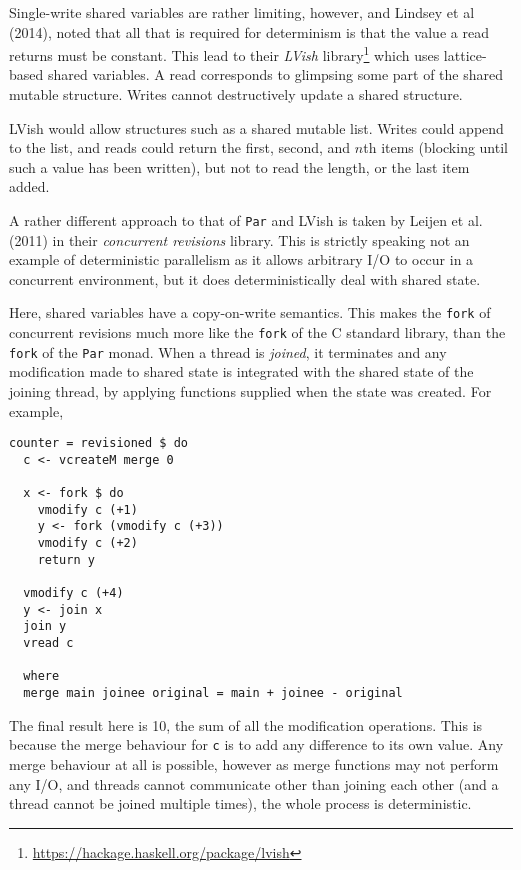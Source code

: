 Single-write shared variables are rather limiting, however, and
Lindsey et al (2014)\nocite{lvish}, noted that all that is required
for determinism is that the value a read returns must be
constant. This lead to their \textit{LVish}
library\footnote{\url{https://hackage.haskell.org/package/lvish}}
which uses lattice-based shared variables. A read corresponds to
glimpsing some part of the shared mutable structure. Writes cannot
destructively update a shared structure.

LVish would allow structures such as a shared mutable list. Writes
could append to the list, and reads could return the first, second,
and $n$th items (blocking until such a value has been written), but
not to read the length, or the last item added.

A rather different approach to that of \verb|Par| and LVish is taken
by Leijen et al. (2011)\nocite{revisions} in their \textit{concurrent
  revisions} library. This is strictly speaking not an example of
deterministic parallelism as it allows arbitrary I/O to occur in a
concurrent environment, but it does deterministically deal with shared
state.

Here, shared variables have a copy-on-write semantics. This makes the
\verb|fork| of concurrent revisions much more like the \verb|fork| of
the C standard library, than the \verb|fork| of the \verb|Par|
monad. When a thread is \textit{joined}, it terminates and any
modification made to shared state is integrated with the shared state
of the joining thread, by applying functions supplied when the state
was created. For example,

\begin{verbatim}
counter = revisioned $ do
  c <- vcreateM merge 0

  x <- fork $ do
    vmodify c (+1)
    y <- fork (vmodify c (+3))
    vmodify c (+2)
    return y

  vmodify c (+4)
  y <- join x
  join y
  vread c

  where
  merge main joinee original = main + joinee - original
\end{verbatim}

The final result here is 10, the sum of all the modification
operations. This is because the merge behaviour for \verb|c| is to add
any difference to its own value. Any merge behaviour at all is
possible, however as merge functions may not perform any I/O, and
threads cannot communicate other than joining each other (and a thread
cannot be joined multiple times), the whole process is deterministic.

